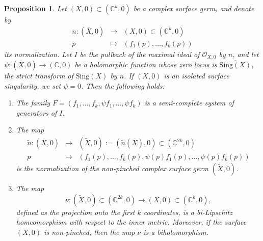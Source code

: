 \documentclass[reqno,dvipsnames,12pt]{amsart}
\newtheorem{prop}[thm]{Proposition}
\begin{document}
\begin{prop}\label{theseminormalizationislipschitz}
Let $(X,0)\subset (\mathbb{C}^k,0)$ be a complex surface germ, and denote by
\[
\begin{array}{ccc}
n : (\overline{X},0) & \longrightarrow & (X,0)\subset(\mathbb{C}^k,0) \\
p & \longmapsto & (f_1(p),\ldots,f_k(p))
\end{array}
\]
its normalization. Let $I$ be the pullback of the maximal ideal of $\mathcal{O}_{X,0}$ by $n$, and let $\psi : (\overline{X},0) \longrightarrow (\mathbb{C},0)$
be a holomorphic function whose zero locus is  $\overline{\mathrm{Sing}(X)}$, the strict transform of $\mathrm{Sing}(X)$ by $n$. If $(X,0)$ is an isolated surface singularity, we set $\psi = 0$. Then the following holds:

\begin{enumerate}
\item \label{pointA} The family $F=(f_1,\ldots,f_k, \psi f_1, \ldots, \psi f_k)$ is a semi-complete system of generators of $I$. 

\item \label{pointB} The map
$$
\begin{array}{ccc}
\widetilde{n} : (\overline{X},0) & \longrightarrow & (\widetilde{X},0):=(\widetilde{n}(\overline{X}),0)\subset(\mathbb{C}^{2k},0) \\
p & \longmapsto & (f_1(p),\ldots,f_k(p), \psi(p)f_1(p), \dots, \psi(p)f_k(p))
\end{array}
$$
is the normalization of the non-pinched complex surface germ $(\widetilde{X},0)$.

\item \label{pointC} The map
\[
\nu : (\widetilde{X},0)\subset(\mathbb{C}^{2k},0) \longrightarrow (X,0) \subset(\mathbb{C}^{k},0),
\]
defined as the projection onto the first $k$ coordinates, is a bi-Lipschitz homeomorphism with respect to the inner metric. Moreover, if the surface $(X,0)$ is non-pinched, then the map $\nu$ is a biholomorphism.
\end{enumerate}
\end{prop}
\end{document}
